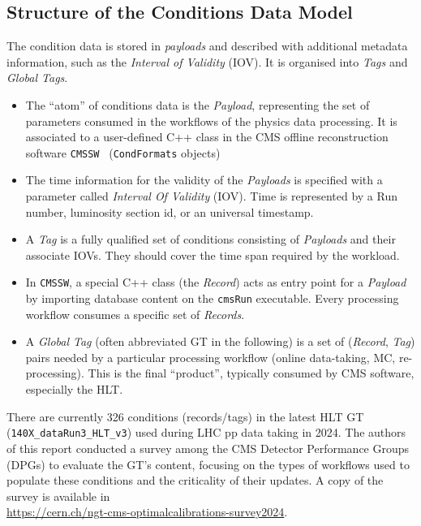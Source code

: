 \subsection{Structure of the Conditions Data Model}
The condition data is stored in \emph{payloads} and described with additional metadata information, such as the \emph{Interval of
Validity} (IOV). It is organised into \emph{Tags} and \emph{Global Tags}.
\begin{itemize}
\item The ``atom'' of conditions data is the \emph{Payload}, representing the set of parameters consumed in the workflows of the physics data processing. It is associated to a user-defined C++ class in the CMS offline reconstruction software \texttt{CMSSW}~\cite{CMSSW_ref} (\texttt{CondFormats} objects)
\item The time information for the validity of the \emph{Payloads} is specified with a parameter called \emph{Interval Of Validity} (IOV). Time is represented by a Run number, luminosity section id, or an universal timestamp.
\item A \emph{Tag} is a fully qualified set of conditions consisting of
\emph{Payloads} and their associate IOVs. They should cover the time span required by the workload.
\item In \texttt{CMSSW}, a special C++ class (the \emph{Record}) acts as entry point for a \emph{Payload} by importing database content on the \texttt{cmsRun} executable. Every processing workflow consumes a specific set of \emph{Records}.
\item A \emph{Global Tag} (often abbreviated GT in the following) is a set of (\emph{Record}, \emph{Tag}) pairs needed by a particular processing workflow (online data-taking, MC, re-processing). This is the final ``product'', typically consumed by CMS software, especially the HLT.
\end{itemize}

There are currently 326 conditions (records/tags) in the latest HLT GT (\texttt{140X\_dataRun3\_HLT\_v3}) used during LHC \Runthree pp data taking in 2024.
The authors of this report conducted a survey among the CMS Detector Performance Groups (DPGs) to evaluate the GT's content, focusing on the types of workflows used to populate these conditions and the criticality of their updates. A copy of the survey is available in\\
\url{https://cern.ch/ngt-cms-optimalcalibrations-survey2024}.

